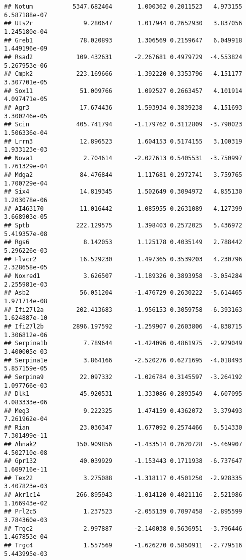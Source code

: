 \documentclass[
]{article}
\begin{document}
\begin{verbatim}
## Notum           5347.682464       1.000362 0.2011523   4.973155 6.587188e-07
## Uts2r              9.280647       1.017944 0.2652930   3.837056 1.245180e-04
## Greb1             78.020893       1.306569 0.2159647   6.049918 1.449196e-09
## Rsad2            109.432631      -2.267681 0.4979729  -4.553824 5.267953e-06
## Cmpk2            223.169666      -1.392220 0.3353796  -4.151177 3.307701e-05
## Sox11             51.009766       1.092527 0.2663457   4.101914 4.097471e-05
## Agr3              17.674436       1.593934 0.3839238   4.151693 3.300246e-05
## Scin             405.741794      -1.179762 0.3112809  -3.790023 1.506336e-04
## Lrrn3             12.896523       1.604153 0.5174155   3.100319 1.933123e-03
## Nova1              2.704614      -2.027613 0.5405531  -3.750997 1.761329e-04
## Mdga2             84.476844       1.117681 0.2972741   3.759765 1.700729e-04
## Six4              14.819345       1.502649 0.3094972   4.855130 1.203078e-06
## AI463170          11.016442       1.085955 0.2631089   4.127399 3.668903e-05
## Sptb             222.129575       1.398403 0.2572025   5.436972 5.419357e-08
## Rgs6               8.142053       1.125178 0.4035149   2.788442 5.296226e-03
## Flvcr2            16.529230       1.497365 0.3539203   4.230796 2.328658e-05
## Noxred1            3.626507      -1.189326 0.3893958  -3.054284 2.255981e-03
## Asb2              56.051204      -1.476729 0.2630222  -5.614465 1.971714e-08
## Ifi27l2a         202.413683      -1.956153 0.3059758  -6.393163 1.624887e-10
## Ifi27l2b        2896.197592      -1.259907 0.2603806  -4.838715 1.306812e-06
## Serpina1b          7.789644      -1.424096 0.4861975  -2.929049 3.400005e-03
## Serpina1e          3.864166      -2.520276 0.6271695  -4.018493 5.857159e-05
## Serpina9          22.097332      -1.026784 0.3145597  -3.264192 1.097766e-03
## Dlk1              45.920531       1.333086 0.2893549   4.607095 4.083333e-06
## Meg3               9.222325       1.474159 0.4362072   3.379493 7.261962e-04
## Rian              23.036347       1.677092 0.2574466   6.514330 7.301499e-11
## Ahnak2           150.909856      -1.433514 0.2620728  -5.469907 4.502710e-08
## Gpr132            40.039929      -1.153443 0.1711938  -6.737647 1.609716e-11
## Tex22              3.275088      -1.318117 0.4501250  -2.928335 3.407823e-03
## Akr1c14          266.895943      -1.014120 0.4021116  -2.521986 1.166943e-02
## Prl2c5             1.237523      -2.055139 0.7097458  -2.895599 3.784360e-03
## Trgc2              2.997887      -2.140038 0.5636951  -3.796446 1.467853e-04
## Trgc4              1.557569      -1.626270 0.5850911  -2.779516 5.443995e-03

\end{verbatim}
\end{document}
